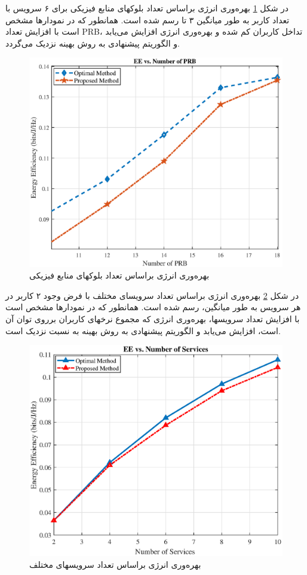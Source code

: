 در شکل \ref{fig:f1a2}
بهره‌وری انرژی براساس تعداد بلوکهای منابع فیزیکی برای ۶ سرویس با تعداد کاربر به طور میانگین ۳ تا رسم شده است. همانطور که در نمودارها مشخص است با افزایش تعداد PRB، تداخل کاربران کم شده و بهره‌وری انرژی افزایش می‌یابد و الگوریتم پیشنهادی به روش بهینه نزدیک می‌گردد.  
\begin{figure}%
	\centering
	\includegraphics[width=\linewidth]{./fig/fig_prb1}
	\caption{بهره‌وری انرژی براساس تعداد بلوکهای منابع فیزیکی}
	\label{fig:f1a2}
\end{figure}

در شکل \ref{fig:f1a3}
بهره‌وری انرژی براساس تعداد سرویسای مختلف با فرض وجود ۲ کاربر در هر سرویس به طور میانگین، رسم شده است. همانطور که در نمودارها مشخص است با افزایش تعداد سرویسها، بهره‌وری انرژی که مجموع نرخهای کاربران برروی توان آن است، افزایش می‌یابد و الگوریتم پیشنهادی به روش بهینه به نسبت نزدیک است‌.  
\begin{figure}%
	\centering
	\includegraphics[width=\linewidth]{./fig/fig_service1}
	\caption{بهره‌وری انرژی براساس تعداد سرویسهای مختلف }
	\label{fig:f1a3}
\end{figure}


